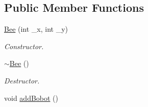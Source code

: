 \subsection*{Public Member Functions}
\begin{DoxyCompactItemize}
\item 
\hyperlink{classBee_ae8ca9eb389ca41c76bab7058f731abc9}{Bee} (int \-\_\-x, int \-\_\-y)
\begin{DoxyCompactList}\small\item\em Constructor. \end{DoxyCompactList}\item 
\hypertarget{classBee_a769176476ccc499cf45889c3e03baaa2}{\hyperlink{classBee_a769176476ccc499cf45889c3e03baaa2}{$\sim$\-Bee} ()}\label{classBee_a769176476ccc499cf45889c3e03baaa2}

\begin{DoxyCompactList}\small\item\em Destructor. \end{DoxyCompactList}\item 
\hypertarget{classBee_ac13663a9bc08b75dc1120f9e84acc819}{void \hyperlink{classBee_ac13663a9bc08b75dc1120f9e84acc819}{add\-Bobot} ()}\label{classBee_ac13663a9bc08b75dc1120f9e84acc819}


\end{DoxyCompactItemize}
